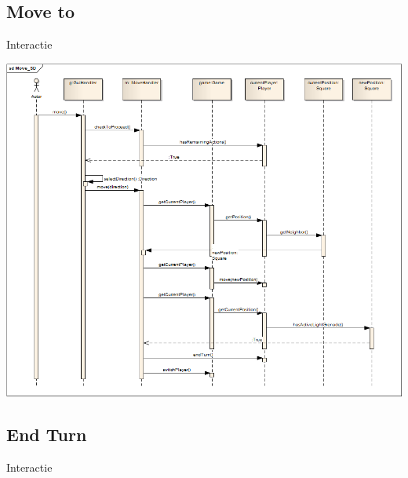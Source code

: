 \documentclass[t]{beamer}
\begin{document}
\subsection{Move to}
\begin{frame}{Interactie}
\begin{multicols}{2}
\tableofcontents[currentsection]
\end{multicols}
\end{frame}

\begin{frame}[plain]
\begin{center}
\includegraphics[width= 1\linewidth]{../uml/move_SD.png}
\end{center}
\end{frame}

\subsection{End Turn}
\begin{frame}{Interactie}
\begin{multicols}{2}
\tableofcontents[currentsection]
\end{multicols}
\end{frame}
\end{document}
